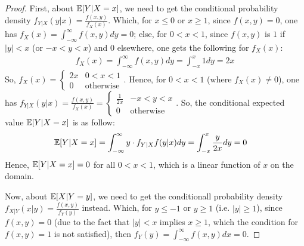 \documentclass{article}
\begin{document}
\begin{proof}
    First, about $\mathbb{E}[Y|X=x]$, we need to get the conditional probability density $f_{Y|X}(y|x) = \frac{f(x,y)}{f_X(x)}$. Which, for $x\leq 0$ or $x\geq 1$, since $f(x,y)=0$, one has $f_X(x) = \int_{-\infty}^{\infty}f(x,y)dy = 0$; else, for $0<x<1$, since $f(x,y)$ is $1$ if $|y|<x$ (or $-x<y<x$) and $0$ elsewhere, one gets the following for $f_X(x)$:
    \begin{align}
        f_X(x)=\int_{-\infty}^{\infty}f(x,y)dy = \int_{-x}^{x}1 dy  = 2x
    \end{align}
    So, $f_X(x) = \begin{cases}
        2x & 0<x<1\\
        0 &\text{otherwise}
    \end{cases}$. Hence, for $0<x<1$ (where $f_X(x)\neq 0$), one has $f_{Y|X}(y|x) = \frac{f(x,y)}{f_X(x)} = \begin{cases}
        \frac{1}{2x} & -x<y<x\\
        0 & \text{otherwise}
    \end{cases}$. So, the conditional expected value $\mathbb{E}[Y|X=x]$ is as follow:
    \begin{align}
        \mathbb{E}[Y|X=x] &= \int_{-\infty}^{\infty}y\cdot f_{Y|X}f(y|x)dy = \int_{-x}^{x}\frac{y}{2x}dy  = 0
    \end{align}
    Hence, $\mathbb{E}[Y|X=x] = 0$ for all $0<x<1$, which is a linear function of $x$ on the domain.

    \hfil

    Now, about $\mathbb{E}[X|Y=y]$, we need to get the conditionall probability density $f_{X|Y}(x|y) = \frac{f(x,y)}{f_Y(y)}$ instead. Which, for $y\leq -1$ or $y\geq 1$ (i.e. $|y|\geq 1$), since $f(x,y)=0$ (due to the fact that $|y|<x$ implies $x\geq 1$, which the condition for $f(x,y)=1$ is not satisfied), then $f_Y(y) = \int_{-\infty}^{\infty}f(x,y)dx = 0$.


\end{proof}
\end{document}
